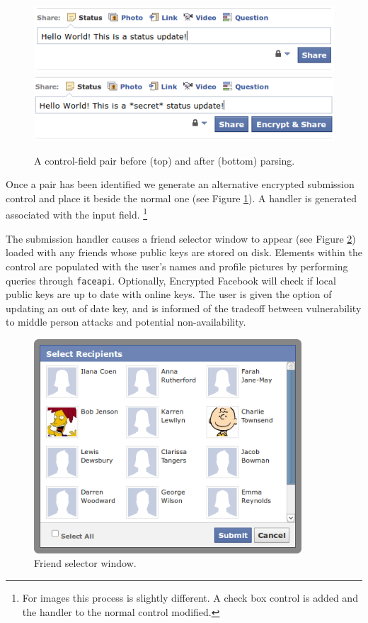     \begin{figure}[tbph]
        \begin{center}
                \includegraphics[width=12cm]{screens/control1.png}
                \includegraphics[width=12cm]{screens/control2.png}
            \caption{A control-field pair before (top) and after (bottom) parsing.}
            \label{scn:ctrl}
        \end{center}
    \end{figure}

Once a pair has been identified we generate an alternative encrypted submission control and place it beside the normal one (see Figure \ref{scn:ctrl}). A handler is generated associated with the input field. \footnote{For images this process is slightly different. A check box control is added and the handler to the normal control modified.}

The submission handler causes a friend selector window to appear (see Figure \ref{scn:fselector}) loaded with any friends whose public keys are stored on disk. Elements within the control are populated with the user's names and profile pictures by performing queries through {\tt faceapi}. Optionally, Encrypted Facebook will check if local public keys are up to date with online keys. The user is given the option of updating an out of date key, and is informed of the tradeoff between vulnerability to middle person attacks and potential non-availability.


    \begin{figure}[tbph]
        \begin{center}
                \includegraphics[width=10cm]{screens/fselector.png}
            \caption{Friend selector window.}
            \label{scn:fselector}
        \end{center}
    \end{figure}

